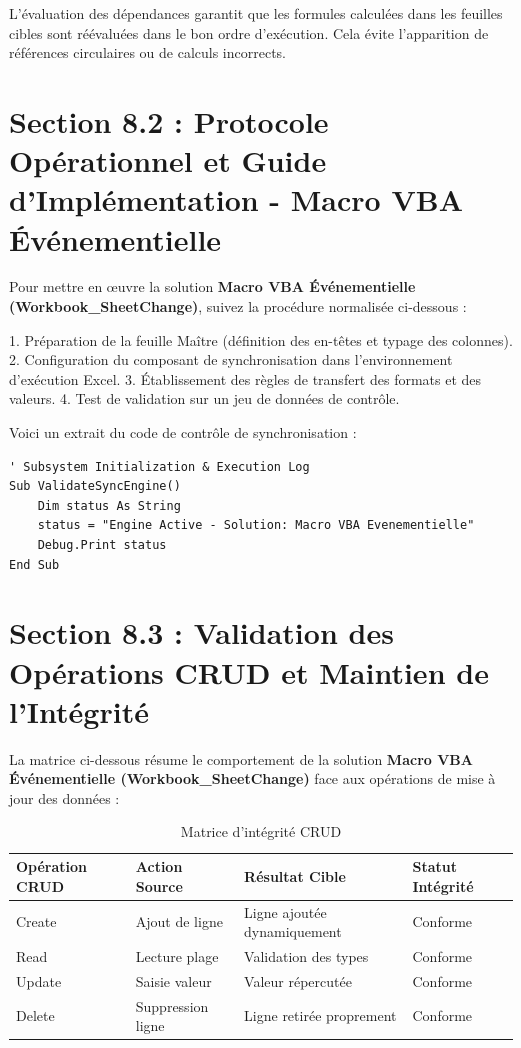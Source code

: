 \documentclass[12pt,a4paper]{report}
\begin{document}
L'évaluation des dépendances garantit que les formules calculées dans les feuilles cibles sont réévaluées dans le bon ordre d'exécution. Cela évite l'apparition de références circulaires ou de calculs incorrects.


\section{Section 8.2 : Protocole Opérationnel et Guide d'Implémentation - Macro VBA Événementielle}
Pour mettre en œuvre la solution \textbf{Macro VBA Événementielle (Workbook\_SheetChange)}, suivez la procédure normalisée ci-dessous :

1. Préparation de la feuille Maître (définition des en-têtes et typage des colonnes).
2. Configuration du composant de synchronisation dans l'environnement d'exécution Excel.
3. Établissement des règles de transfert des formats et des valeurs.
4. Test de validation sur un jeu de données de contrôle.

Voici un extrait du code de contrôle de synchronisation :
\begin{lstlisting}[caption=Code de controle operationnel]
' Subsystem Initialization & Execution Log
Sub ValidateSyncEngine()
    Dim status As String
    status = "Engine Active - Solution: Macro VBA Evenementielle"
    Debug.Print status
End Sub
\end{lstlisting}


\section{Section 8.3 : Validation des Opérations CRUD et Maintien de l'Intégrité}
La matrice ci-dessous résume le comportement de la solution \textbf{Macro VBA Événementielle (Workbook\_SheetChange)} face aux opérations de mise à jour des données :

\begin{table}[h]
\centering
\begin{tabular}{@{}llll@{}}
\toprule
\textbf{Opération CRUD} & \textbf{Action Source} & \textbf{Résultat Cible} & \textbf{Statut Intégrité} \\ \midrule
Create & Ajout de ligne & Ligne ajoutée dynamiquement & Conforme \\
Read & Lecture plage & Validation des types & Conforme \\
Update & Saisie valeur & Valeur répercutée & Conforme \\
Delete & Suppression ligne & Ligne retirée proprement & Conforme \\ \bottomrule
\end{tabular}
\caption{Matrice d'intégrité CRUD}
\end{table}
\end{document}
